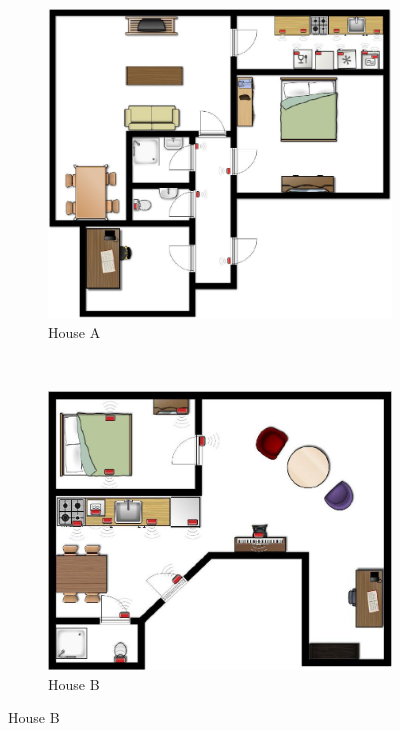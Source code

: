 \begin{figure}
	\centering
	\begin{subfigure}[b]{0.25\textwidth}
		\includegraphics[width=\textwidth]{fig/houseA.png}
		\caption{House A}
		\label{fig:houseA}
	\end{subfigure}
	~
	\begin{subfigure}[b]{0.25\textwidth}
		\includegraphics[width=\textwidth]{fig/houseB.png}
		\caption{House B}
		\label{fig:houseB}
	\end{subfigure}

\end{figure}
